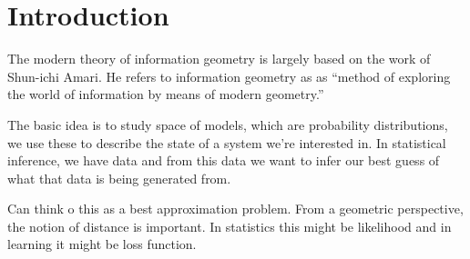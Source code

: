 \documentclass{article}
\begin{document}
\section{Introduction}

The modern theory of information geometry is largely based on the work of Shun-ichi Amari.
He refers to information geometry as as ``method of exploring the world of information by means of modern geometry.''

The basic idea is to study space of models, which are probability distributions, we use these to describe the state of a system we're interested in.
In statistical inference, we have data and from this data we want to infer our best guess of what that data is being generated from.

Can think o this as a best approximation problem.
From a geometric perspective, the notion of distance is important. In statistics this might be likelihood and in learning it might be loss function.
\end{document}

